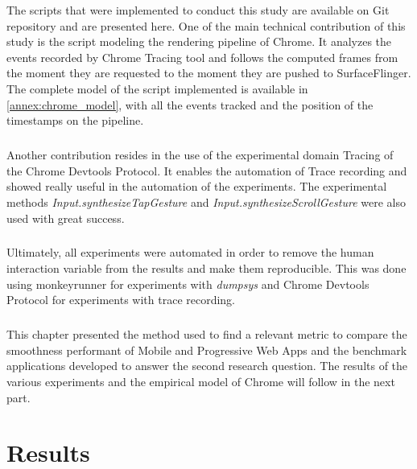 \documentclass{kththesis}
\begin{document}
The scripts that were implemented to conduct this study are available on Git repository and are presented here. One of the main technical contribution of this study is the script modeling the rendering pipeline of Chrome. It analyzes the events recorded by Chrome Tracing tool and follows the computed frames from the moment they are requested to the moment they are pushed to SurfaceFlinger. The complete model of the script implemented is available in \autoref{annex:chrome_model}, with all the events tracked and the position of the timestamps on the pipeline.
\paragraph{}
Another contribution resides in the use of the experimental domain Tracing of the Chrome Devtools Protocol. It enables the automation of Trace recording and showed really useful in the automation of the experiments. The experimental methods \textit{Input.synthesizeTapGesture} and \textit{Input.synthesizeScrollGesture} were also used with great success.
\paragraph{}
Ultimately, all experiments were automated in order to remove the human interaction variable from the results and make them reproducible. This was done using monkeyrunner for experiments with \textit{dumpsys} and Chrome Devtools Protocol for experiments with trace recording.

\paragraph{}
This chapter presented the method used to find a relevant metric to compare the smoothness performant of Mobile and Progressive Web Apps and the benchmark applications developed to answer the second research question. The results of the various experiments and the empirical model of Chrome will follow in the next part.

\chapter{Results}

\end{document}
